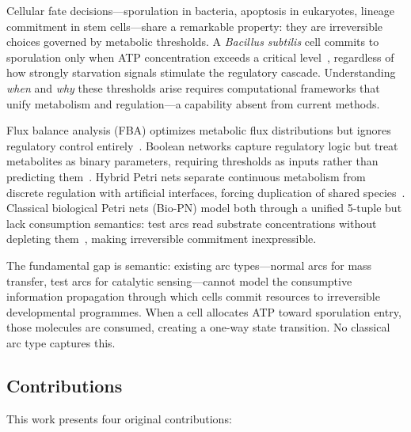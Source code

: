 \documentclass[11pt,a4paper]{article}
\theoremstyle{plain}
\theoremstyle{definition}
\begin{document}
Cellular fate decisions---sporulation in bacteria, apoptosis in eukaryotes, lineage commitment in stem cells---share a remarkable property: they are irreversible choices governed by metabolic thresholds. A \textit{Bacillus subtilis} cell commits to sporulation only when ATP concentration exceeds a critical level~\cite{fujita2005}, regardless of how strongly starvation signals stimulate the regulatory cascade. Understanding \emph{when} and \emph{why} these thresholds arise requires computational frameworks that unify metabolism and regulation---a capability absent from current methods.

Flux balance analysis (FBA) optimizes metabolic flux distributions but ignores regulatory control entirely~\cite{orth2010}. Boolean networks capture regulatory logic but treat metabolites as binary parameters, requiring thresholds as inputs rather than predicting them~\cite{kauffman1969}. Hybrid Petri nets separate continuous metabolism from discrete regulation with artificial interfaces, forcing duplication of shared species~\cite{alla1998}. Classical biological Petri nets (Bio-PN) model both through a unified 5-tuple but lack consumption semantics: test arcs read substrate concentrations without depleting them~\cite{reddy1993petri,chaouiya2007petri,heiner2008}, making irreversible commitment inexpressible.

The fundamental gap is semantic: existing arc types---normal arcs for mass transfer, test arcs for catalytic sensing---cannot model the consumptive information propagation through which cells commit resources to irreversible developmental programmes. When a cell allocates ATP toward sporulation entry, those molecules are consumed, creating a one-way state transition. No classical arc type captures this.

\subsection{Contributions}

This work presents four original contributions:
\end{document}
